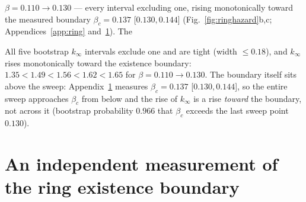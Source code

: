 $\beta = 0.110 \to 0.130$ --- every interval excluding one, rising monotonically
toward the measured boundary $\beta_c = 0.137$ [$0.130, 0.144$]
(Fig.~\ref{fig:ringhazard}b,c; Appendices~\ref{app:ring} and~\ref{app:betac}). The

All five bootstrap $k_\infty$ intervals exclude one and are tight (width
$\le 0.18$), and $k_\infty$ rises monotonically toward the existence boundary:
$1.35 < 1.49 < 1.56 < 1.62 < 1.65$ for $\beta = 0.110 \to 0.130$. The boundary
itself sits above the sweep: Appendix~\ref{app:betac} measures
$\beta_c = 0.137$ [$0.130, 0.144$], so the entire sweep approaches $\beta_c$
from below and the rise of $k_\infty$ is a rise \emph{toward} the boundary, not
across it (bootstrap probability $0.966$ that $\beta_c$ exceeds the last sweep
point $0.130$).


\section{An independent measurement of the ring existence boundary}
\label{app:betac}

